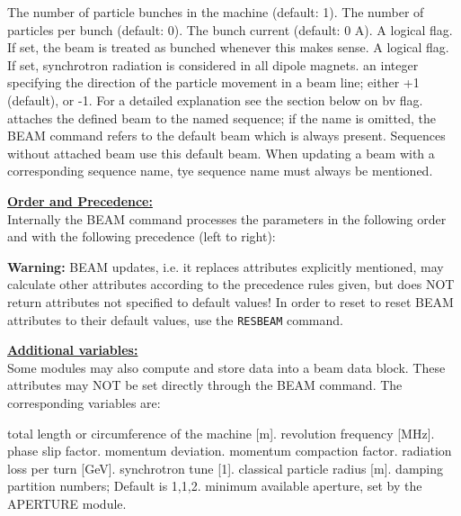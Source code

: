 \begin{madlist}
   The number of particle bunches in the
  machine (default: 1).  
   \label{beam_npart} The number of particles per bunch (default: 0). 
   The bunch current (default: 0 A). 
   A logical flag. If set, the beam is
  treated as bunched whenever this makes sense.  
   \label{beam_radiate} A logical flag. If set, synchrotron
  radiation is considered in all dipole magnets.  
   an integer specifying the direction of the
  particle movement in a beam line; either +1 (default), or -1. For a
  detailed explanation see the section below on bv flag.  
   attaches the defined beam to the named sequence; if
  the name is omitted, the BEAM command refers to the default beam
  which is always present. Sequences without attached beam use this
  default beam. When updating a beam with a corresponding sequence name,
  tye sequence name must always be mentioned.    
\end{madlist} 

\textbf{\underline{Order and Precedence:}}\\
Internally the BEAM command processes the parameters in the following
order and with the following precedence (left to right): 

\textbf{Warning:} BEAM updates, i.e. it replaces attributes explicitly
mentioned, may calculate other attributes according to the precedence rules
given, but does NOT return attributes not specified to default values! 
In order to reset to reset BEAM attributes to their default values, use
the \texttt{RESBEAM} command.


\textbf{\underline{Additional variables:}}\\ 
Some \mad modules may also compute and store data into a beam data 
block. These attributes may NOT be set directly through the BEAM
command. The corresponding variables are:  
\begin{madlist}
   total length or circumference of the machine [m].
   revolution frequency [MHz].
   phase slip factor.
   momentum deviation.
   momentum compaction factor.
   radiation loss per turn [GeV].
   synchrotron tune [1].
   classical particle radius [m].
   damping partition numbers; Default is {1,1,2}.
   minimum available aperture, set by the APERTURE module.
\end{madlist}


